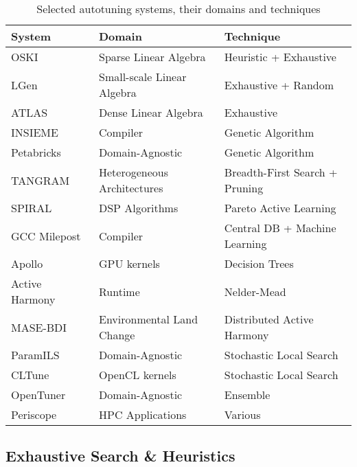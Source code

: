 \begin{table}[htpb]
    \centering
    \begin{tabular}{@{}lll@{}}
        \toprule
        System & Domain & Technique \\ \midrule
        OSKI~\cite{vuduc2005oski} & Sparse Linear Algebra & Heuristic + Exhaustive \\
        LGen~\cite{spampinato2014basic} & Small-scale Linear Algebra & Exhaustive + Random \\
        ATLAS~\cite{dongarra1998automatically} & Dense Linear Algebra & Exhaustive \\
        INSIEME~\cite{jordan2012multi} & Compiler & Genetic Algorithm \\
        Petabricks~\cite{ansel2009petabricks} & Domain-Agnostic & Genetic Algorithm\\
        TANGRAM~\cite{chang2016efficient} & Heterogeneous Architectures & Breadth-First Search + Pruning \\
        SPIRAL~\cite{puschel2005spiral} & DSP Algorithms & Pareto Active Learning \\
        GCC Milepost~\cite{fursin2011milepost} & Compiler & Central DB + Machine Learning \\
        Apollo~\cite{beckingsale2017apollo} & GPU kernels & Decision Trees \\
        Active Harmony~\cite{tapus2002active} & Runtime & Nelder-Mead \\
        MASE-BDI~\cite{coelho2016mase} & Environmental Land Change & Distributed Active Harmony~\cite{tapus2002active} \\
        ParamILS~\cite{hutter2009paramils} & Domain-Agnostic & Stochastic Local Search \\
        CLTune~\cite{nugteren2015cltune} & OpenCL kernels & Stochastic Local Search\\
        OpenTuner~\cite{ansel2014opentuner} & Domain-Agnostic & Ensemble \\
        Periscope~\cite{gerndt2017multi} & HPC Applications & Various \\
        \bottomrule
    \end{tabular}
    \caption{Selected autotuning systems, their domains and techniques}
\end{table}

\subsection{Exhaustive Search \& Heuristics}

